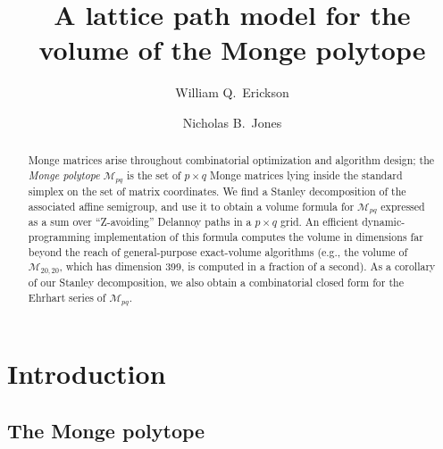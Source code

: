\documentclass[noamsfonts,10pt]{amsart}
\title{A lattice path model for the volume of the Monge polytope}
\author{William Q.~Erickson}
\author{Nicholas B.~Jones}
\newcommand{\M}{\mathcal{M}}
\newcommand{\1}{\mathbf{1}}
\theoremstyle{plain}
\theoremstyle{definition}
\numberwithin{equation}{section}
\begin{document}
\begin{abstract}
    Monge matrices arise throughout combinatorial optimization and algorithm design;
    the \emph{Monge polytope} $\M_{pq}$ is the set of $p \times q$ Monge matrices lying inside the standard simplex on the set of matrix coordinates.
    We find a Stanley decomposition of the associated affine semigroup, and use it to obtain a volume formula for $\M_{pq}$ expressed as a sum over ``Z-avoiding'' Delannoy paths in a $p \times q$ grid.
    An efficient dynamic-programming implementation of this formula computes the volume in dimensions far beyond the reach of general-purpose exact-volume algorithms (e.g., the volume of $\M_{20,20}$, which has dimension 399, is computed in a fraction of a second).
    As a corollary of our Stanley decomposition, we also obtain a combinatorial closed form for the Ehrhart series of $\M_{pq}$.
\end{abstract}








\maketitle

\setcounter{tocdepth}{1}

\renewcommand{\baselinestretch}{0.5}\normalsize
\tableofcontents
\renewcommand{\baselinestretch}{1.0}\normalsize

\section{Introduction}

\subsection*{The Monge polytope}
\end{document}
